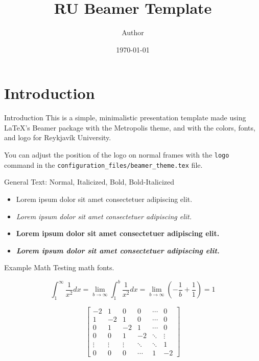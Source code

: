 \documentclass[aspectratio=169]{beamer}
\title{RU Beamer Template}
\author{Author}
\institute{Reykjavík University\\Department of Computer Science}
\date{\specialdate\today}
\begin{document}
\maketitle

\section{Introduction}

\begin{frame}{Introduction}
    This is a simple, minimalistic presentation template made using \LaTeX's Beamer package with the Metropolis theme, and with the colors, fonts, and logo for Reykjavík University.
    
    You can adjust the position of the logo on normal frames with the \texttt{logo} command in the \texttt{configuration\_files/beamer\_theme.tex} file.
    
\end{frame}

\begin{frame}{General Text: Normal, Italicized, Bold, Bold-Italicized}
    \begin{itemize}
        \item Lorem ipsum dolor sit amet consectetuer adipiscing elit.
        \item \textit{Lorem ipsum dolor sit amet consectetuer adipiscing elit.}
        \item \textbf{Lorem ipsum dolor sit amet consectetuer adipiscing elit.}
        \item \textbf{\textit{Lorem ipsum dolor sit amet consectetuer adipiscing elit.}}
    \end{itemize}
    
\end{frame}

\begin{frame}{Example Math}
    Testing math fonts.
    
    $$\int_{1}^{\infty} \frac{1}{x^2} dx = \lim_{b \rightarrow \infty} \int_{1}^{b} \frac{1}{x^2} dx = \lim_{b \rightarrow \infty} \left( - \frac{1}{b} + \frac{1}{1} \right) = 1$$
    
    \[
    \left[
	\begin{matrix}
		-2 & 1 & 0 & 0 & \cdots & 0  \\
		1 & -2 & 1 & 0 & \cdots & 0  \\
		0 & 1 & -2 & 1 & \cdots & 0  \\
		0 & 0 & 1 & -2 & \ddots & \vdots \\
		\vdots & \vdots & \vdots & \ddots & \ddots & 1  \\
		0 & 0 & 0 & \cdots & 1 & -2
	\end{matrix}
	\right]
    \]
    
\end{frame}
\end{document}
